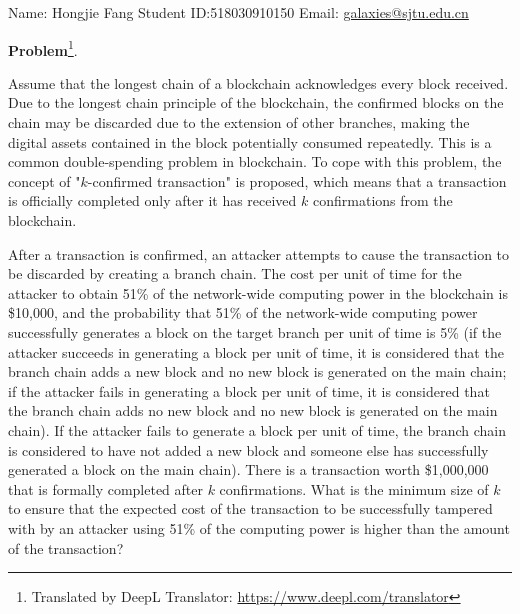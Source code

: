 \documentclass{oxmathproblems}
\theoremstyle{definition}
\begin{document}
\begin{center}
	Name: Hongjie Fang \quad Student ID:518030910150 \quad Email: \href{mailto:galaxies@sjtu.edu.cn}{galaxies@sjtu.edu.cn}
\end{center}
\textbf{Problem}\footnote{Translated by DeepL Translator: \url{https://www.deepl.com/translator}}.

Assume that the longest chain of a blockchain acknowledges every block received. Due to the longest chain principle of the blockchain, the confirmed blocks on the chain may be discarded due to the extension of other branches, making the digital assets contained in the block potentially consumed repeatedly. This is a common double-spending problem in blockchain. To cope with this problem, the concept of "$k$-confirmed transaction" is proposed, which means that a transaction is officially completed only after it has received $k$ confirmations from the blockchain.

After a transaction is confirmed, an attacker attempts to cause the transaction to be discarded by creating a branch chain. The cost per unit of time for the attacker to obtain 51\% of the network-wide computing power in the blockchain is \$10,000, and the probability that 51\% of the network-wide computing power successfully generates a block on the target branch per unit of time is 5\% (if the attacker succeeds in generating a block per unit of time, it is considered that the branch chain adds a new block and no new block is generated on the main chain; if the attacker fails in generating a block per unit of time, it is considered that the branch chain adds no new block and no new block is generated on the main chain). If the attacker fails to generate a block per unit of time, the branch chain is considered to have not added a new block and someone else has successfully generated a block on the main chain). There is a transaction worth \$1,000,000 that is formally completed after $k$ confirmations. What is the minimum size of $k$ to ensure that the expected cost of the transaction to be successfully tampered with by an attacker using 51\% of the computing power is higher than the amount of the transaction?
\end{document}
